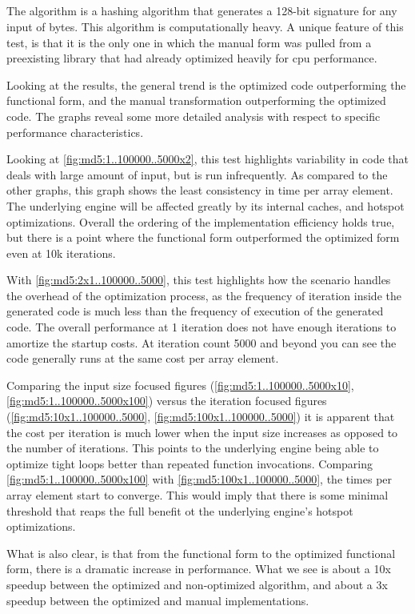 \subsection{\mdfive}
The \mdfive algorithm \cite{mdfive92} is a hashing algorithm that generates a 128-bit signature for any input of bytes. This algorithm is computationally heavy. A unique feature of this test, is that it is the only one in which the manual form was pulled from a preexisting library that had already optimized heavily for cpu performance.

Looking at the results, the general trend is the optimized code outperforming the functional form, and the manual transformation outperforming the optimized code.  The graphs reveal some more detailed analysis with respect to specific performance characteristics.

Looking at \ref{fig:md5:1..100000..5000x2}, this test highlights variability in code that deals with large amount of input, but is run infrequently. As compared to the other graphs, this graph shows the least consistency in time per array element. The underlying engine will be affected greatly by its internal caches, and hotspot optimizations. Overall the ordering of the implementation efficiency holds true, but there is a point where the functional form outperformed the optimized form even at 10k iterations. 

With \ref{fig:md5:2x1..100000..5000}, this test highlights how the scenario handles the overhead of the optimization process, as the frequency of iteration inside the generated code is much less than the frequency of execution of the generated code. The overall performance at 1 iteration does not have enough iterations to amortize the startup costs.  At iteration count 5000 and beyond you can see the code generally runs at the same cost per array element.  

Comparing the input size focused figures (\ref{fig:md5:1..100000..5000x10}, \ref{fig:md5:1..100000..5000x100}) versus the iteration focused figures (\ref{fig:md5:10x1..100000..5000}, \ref{fig:md5:100x1..100000..5000}) it is apparent that the cost per iteration is much lower when the input size increases as opposed to the number of iterations. This points to the underlying engine being able to optimize tight loops better than repeated function invocations.  Comparing \ref{fig:md5:1..100000..5000x100} with \ref{fig:md5:100x1..100000..5000}, the times per array element start to converge.  This would imply that there is some minimal threshold that reaps the full benefit ot the underlying engine's hotspot optimizations. 

What is also clear, is that from the functional form to the optimized functional form, there is a dramatic increase in performance.  What we see is about a 10x speedup between the optimized and non-optimized algorithm, and about a 3x speedup between the optimized and manual implementations. 